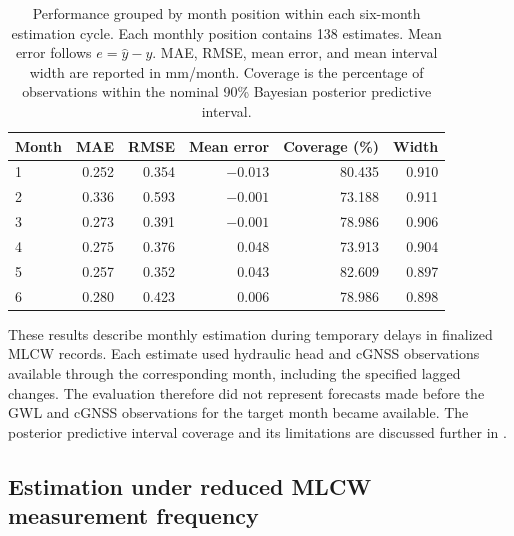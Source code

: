 \begin{table}[htbp]
  \centering
  \small
  \renewcommand{\arraystretch}{1.15}
  \caption[Performance by month position within each estimation cycle.]{Performance grouped by month position within each six-month estimation cycle. Each monthly position contains 138 estimates. Mean error follows $e=\hat{y}-y$. MAE, RMSE, mean error, and mean interval width are reported in mm/month. Coverage is the percentage of observations within the nominal 90\% Bayesian posterior predictive interval.}
  \label{tab:delayed_performance_by_month}
  \begin{tabular}{lrrrrr}
    \toprule
    \textbf{Month} & \textbf{MAE} & \textbf{RMSE} & \textbf{Mean error} & \textbf{Coverage (\%)} & \textbf{Width} \\
    \midrule
    1 & 0.252 & 0.354 & $-0.013$ & 80.435 & 0.910 \\
    2 & 0.336 & 0.593 & $-0.001$ & 73.188 & 0.911 \\
    3 & 0.273 & 0.391 & $-0.001$ & 78.986 & 0.906 \\
    4 & 0.275 & 0.376 & 0.048 & 73.913 & 0.904 \\
    5 & 0.257 & 0.352 & 0.043 & 82.609 & 0.897 \\
    6 & 0.280 & 0.423 & 0.006 & 78.986 & 0.898 \\
    \bottomrule
  \end{tabular}
\end{table}

\FloatBarrier

These results describe monthly estimation during temporary delays in finalized MLCW records. Each estimate used hydraulic head and cGNSS observations available through the corresponding month, including the specified lagged changes. The evaluation therefore did not represent forecasts made before the GWL and cGNSS observations for the target month became available. The posterior predictive interval coverage and its limitations are discussed further in .

\FloatBarrier

\subsection{Estimation under reduced MLCW measurement frequency}
\label{subsec:results_reduced_frequency}



